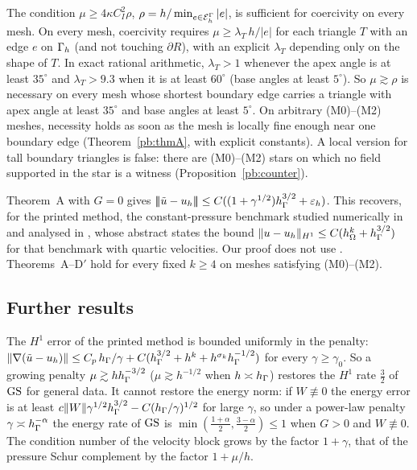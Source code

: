\begin{propositionE}
The condition $\mu\ge4\kappa C_I^2\rho$, $\rho=h/\min_{e\in\mathcal E_h^\Gamma}|e|$, is sufficient for coercivity on every mesh. On every mesh, coercivity requires $\mu\ge\lambda_T\,h/|e|$ for each triangle $T$ with an edge $e$ on $\Gamma_h$ (and not touching $\partial R$), with an explicit $\lambda_T$ depending only on the shape of $T$. In exact rational arithmetic, $\lambda_T>1$ whenever the apex angle is at least $35^\circ$ and $\lambda_T>9.3$ when it is at least $60^\circ$ (base angles at least $5^\circ$). So $\mu\gtrsim\rho$ is necessary on every mesh whose shortest boundary edge carries a triangle with apex angle at least $35^\circ$ and base angles at least $5^\circ$. On arbitrary (M0)--(M2) meshes, necessity holds as soon as the mesh is locally fine enough near one boundary edge (Theorem~\ref{pb:thmA}, with explicit constants). A local version for tall boundary triangles is false: there are (M0)--(M2) stars on which no field supported in the star is a witness (Proposition~\ref{pb:counter}).
\end{propositionE}

Theorem~A with $G=0$ gives $|\!|\!|\tilde u-u_h|\!|\!|\le C((1+\gamma^{1/2})h_\Gamma^{3/2}+\varepsilon_h)$. This recovers, for the printed method, the constant-pressure benchmark studied numerically in \cite{GjerdeScott2024,ScottPrize} and analysed in \cite{Cavalcante}, whose abstract states the bound $\lVert u-u_h\rVert_{H^1}\le C(h_\Omega^k+h_\Gamma^{3/2})$ for that benchmark with quartic velocities. Our proof does not use \cite{Cavalcante}. Theorems~A--D$'$ hold for every fixed $k\ge4$ on meshes satisfying (M0)--(M2).

\subsection*{Further results}
\begin{theoremR}
The $H^1$ error of the printed method is bounded uniformly in the penalty: $\lVert \nabla(\tilde u-u_h)\rVert\le C_p\,h_\Gamma/\gamma+C(h_\Gamma^{3/2}+h^k+h^{\sigma_k}h_\Gamma^{-1/2})$ for every $\gamma\ge\gamma_0$. So a growing penalty $\mu\gtrsim hh_\Gamma^{-3/2}$ ($\mu\gtrsim h^{-1/2}$ when $h\asymp h_\Gamma$) restores the $H^1$ rate $\frac32$ of $\mathrm{GS}$ for general data. It cannot restore the energy norm: if $W\not\equiv0$ the energy error is at least $c\lVert W\rVert\gamma^{1/2}h_\Gamma^{3/2}-C(h_\Gamma/\gamma)^{1/2}$ for large $\gamma$, so under a power-law penalty $\gamma\asymp h_\Gamma^{-\alpha}$ the energy rate of $\mathrm{GS}$ is $\min(\frac{1+\alpha}2,\frac{3-\alpha}2)\le1$ when $G>0$ and $W\not\equiv0$. The condition number of the velocity block grows by the factor $1+\gamma$, that of the pressure Schur complement by the factor $1+\mu/h$.
\end{theoremR}

